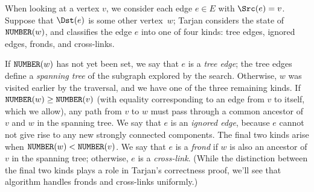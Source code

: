 \documentclass[../generics]{subfiles}
\begin{document}
When looking at a vertex $v$, we consider each edge $e\in E$ with $\Src(e)=v$. Suppose that $\Dst(e)$ is some other vertex~$w$; Tarjan considers the state of $\texttt{NUMBER}(w)$, and classifies the edge $e$ into one of four kinds: tree edges, ignored edges, fronds, and cross-links.

If $\texttt{NUMBER}(w)$ has not yet been set, we say that $e$ is a \emph{tree edge}; the tree edges define a \emph{spanning tree} of the subgraph explored by the search. Otherwise, $w$ was visited earlier by the traversal, and we have one of the three remaining kinds. If $\texttt{NUMBER}(w)\geq\texttt{NUMBER}(v)$ (with equality corresponding to an edge from $v$ to itself, which we allow), any path from $v$ to $w$ must pass through a common ancestor of $v$ and $w$ in the spanning tree. We say that $e$ is an \emph{ignored edge}, because $e$ cannot not give rise to any new strongly connected components. The final two kinds arise when $\texttt{NUMBER}(w)<\texttt{NUMBER}(v)$. We say that $e$ is a \emph{frond} if $w$ is also an ancestor of $v$ in the spanning tree; otherwise, $e$ is a \emph{cross-link}. (While the distinction between the final two kinds plays a role in Tarjan's correctness proof, we'll see that algorithm handles fronds and cross-links uniformly.)

\begin{figure}
\end{figure}
\end{document}
